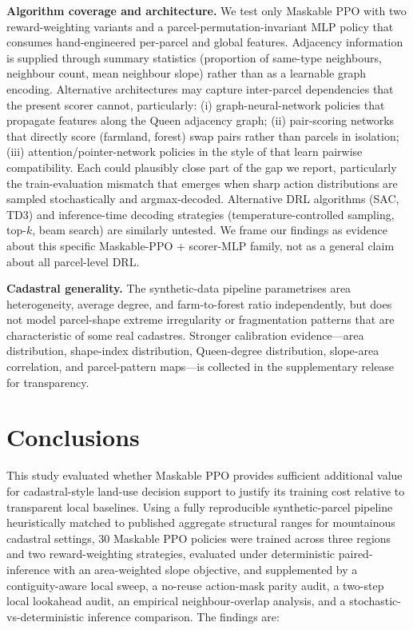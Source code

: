 \documentclass[]{interact}
\theoremstyle{plain}
\begin{document}
\textbf{Algorithm coverage and architecture.} We test only Maskable PPO with two reward-weighting variants and a parcel-permutation-invariant MLP policy that consumes hand-engineered per-parcel and global features. Adjacency information is supplied through summary statistics (proportion of same-type neighbours, neighbour count, mean neighbour slope) rather than as a learnable graph encoding. Alternative architectures may capture inter-parcel dependencies that the present scorer cannot, particularly: (i) graph-neural-network policies that propagate features along the Queen adjacency graph; (ii) pair-scoring networks that directly score (farmland, forest) swap pairs rather than parcels in isolation; (iii) attention/pointer-network policies in the style of \citet{kool2019attention} that learn pairwise compatibility. Each could plausibly close part of the gap we report, particularly the train-evaluation mismatch that emerges when sharp action distributions are sampled stochastically and argmax-decoded. Alternative DRL algorithms (SAC, TD3) and inference-time decoding strategies (temperature-controlled sampling, top-$k$, beam search) are similarly untested. We frame our findings as evidence about this specific Maskable-PPO + scorer-MLP family, not as a general claim about all parcel-level DRL.

\textbf{Cadastral generality.} The synthetic-data pipeline parametrises area heterogeneity, average degree, and farm-to-forest ratio independently, but does not model parcel-shape extreme irregularity or fragmentation patterns that are characteristic of some real cadastres. Stronger calibration evidence---area distribution, shape-index distribution, Queen-degree distribution, slope-area correlation, and parcel-pattern maps---is collected in the supplementary release for transparency.

\section{Conclusions}\label{sec:concl}

This study evaluated whether Maskable PPO provides sufficient additional value for cadastral-style land-use decision support to justify its training cost relative to transparent local baselines. Using a fully reproducible synthetic-parcel pipeline heuristically matched to published aggregate structural ranges for mountainous cadastral settings, 30 Maskable PPO policies were trained across three regions and two reward-weighting strategies, evaluated under deterministic paired-inference with an area-weighted slope objective, and supplemented by a contiguity-aware local sweep, a no-reuse action-mask parity audit, a two-step local lookahead audit, an empirical neighbour-overlap analysis, and a stochastic-vs-deterministic inference comparison. The findings are:
\end{document}
